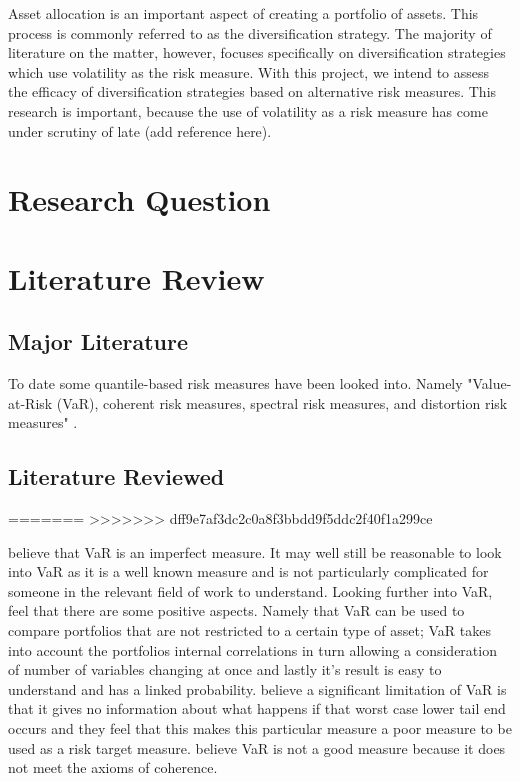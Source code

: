 \documentclass[12pt,a4paper]{article}
\begin{document}
Asset allocation is an important aspect of creating a portfolio of assets. This process is commonly referred to as the diversification strategy. The majority of literature on the matter, however, focuses specifically on diversification strategies which use volatility as the risk measure. With this project, we intend to assess the efficacy of diversification strategies based on alternative risk measures.
This research is important, because the use of volatility as a risk measure has come under scrutiny of late (add reference here).




\section{Research Question}
\label{sec:ResQues}


\section{Literature Review}
\label{sec:LitRev}

\subsection{Major Literature}
\label{subsec:MajLit}
To date some quantile-based risk measures have been looked into. Namely "Value-at-Risk (VaR), coherent risk measures, spectral risk measures, and distortion risk measures" \citep{dowd2006after}.

\subsection{Literature Reviewed}
\label{subsec:LitRevd}	
=======
>>>>>>> dff9e7af3dc2c0a8f3bbdd9f5ddc2f40f1a299ce

 \cite{dowd2006after} believe that VaR is an imperfect measure. It may well still be reasonable to look into VaR as it is a well known measure and is not particularly complicated for someone in the relevant field of work to understand. Looking further into VaR, \cite{dowd2006after} feel that there are some positive aspects. Namely that VaR can be used to compare portfolios that are not restricted to a certain type of asset; VaR takes into account the portfolios internal correlations in turn allowing a consideration of number of variables changing at once and lastly it's result is easy to understand and has a linked probability.  \cite{dowd2006after} believe a significant limitation of VaR is that it gives no information about what happens if that worst case lower tail end occurs and they feel that this makes this particular measure a poor measure to be used as a risk target measure. \cite{ACERBI20021505} believe VaR is not a good measure because it does not meet the axioms of coherence.
\end{document}
